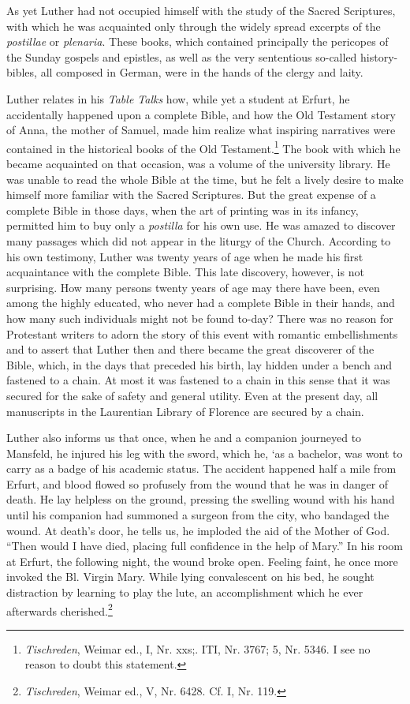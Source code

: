 As yet Luther had not occupied himself with the study of the
Sacred Scriptures, with which he was acquainted only through the
widely spread excerpts of the \textit{postillae} or \textit{plenaria}. These books, which
contained principally the pericopes of the Sunday gospels and epistles, as well as the very sententious so-called history-bibles, all composed in German, were in the hands of the clergy and laity.

Luther relates in his \textit{Table Talks} how, while yet a student at Erfurt,
he accidentally happened upon a complete Bible, and how the
Old Testament story of Anna, the mother of Samuel, made him
realize what inspiring narratives were contained in the historical
books of the Old Testament.\footnote{\textit{Tischreden}, Weimar ed., I, Nr. xxs;. ITI, Nr. 3767; 5, Nr. 5346. I see no reason to doubt this statement.}
The book with which he became acquainted on that occasion, was a volume of the university library.
He was unable to read the whole Bible at the time, but he felt a lively
desire to make himself more familiar with the Sacred Scriptures.
But the great expense of a complete Bible in those days, when the
art of printing was in its infancy, permitted him to buy only a
\textit{postilla} for his own use. He was amazed to discover many passages
which did not appear in the liturgy of the Church. According to
his own testimony, Luther was twenty years of age when he made
his first acquaintance with the complete Bible. This late discovery,
however, is not surprising. How many persons twenty years of age
may there have been, even among the highly educated, who never
had a complete Bible in their hands, and how many such individuals
might not be found to-day? There was no reason for Protestant
writers to adorn the story of this event with romantic embellishments
and to assert that Luther then and there became the great
discoverer of the Bible, which, in the days that preceded his birth,
lay hidden under a bench and fastened to a chain. At most it was
fastened to a chain in this sense that it was secured for the sake
of safety and general utility. Even at the present day, all manuscripts
in the Laurentian Library of Florence are secured by a chain.

Luther also informs us that once, when he and a companion
journeyed to Mansfeld, he injured his leg with the sword, which he,
‘as a bachelor, was wont to carry as a badge of his academic
status. The accident happened half a mile from Erfurt, and blood
flowed so profusely from the wound that he was in danger of death.
He lay helpless on the ground, pressing the swelling wound with his
hand until his companion had summoned a surgeon from the city,
who bandaged the wound. At death’s door, he tells us, he imploded
the aid of the Mother of God. “Then would I have died, placing
full confidence in the help of Mary.” In his room at Erfurt, the following
night, the wound broke open. Feeling faint, he once more
invoked the Bl. Virgin Mary. While lying convalescent on his bed,
he sought distraction by learning to play the lute, an accomplishment which he ever afterwards cherished.\footnote{\textit{Tischreden}, Weimar ed., V, Nr. 6428. Cf. I, Nr. 119.}


